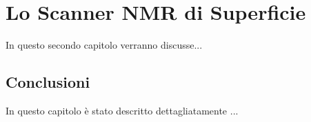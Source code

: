 \chapter{Lo Scanner NMR di Superficie}
\minitoc
\textsf{In questo secondo capitolo verranno discusse...}



\section{Conclusioni}
In questo capitolo è stato descritto dettagliatamente ...




